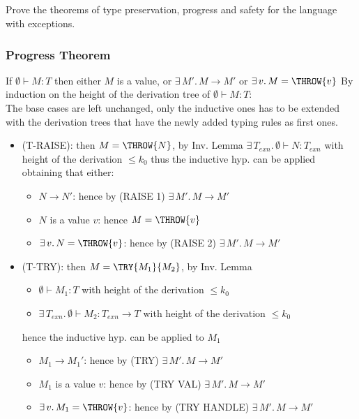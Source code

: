 \subsection{}

Prove the theorems of type preservation, progress and safety for the language with exceptions.

\subsubsection*{Progress Theorem}

If $\emptyset \vdash M: T$ then either $M$ is a value, or $\exists\, M'.\, M \to M'$ or
$\exists\, v.\, M = \THROW{v}$
By induction on the height of the derivation tree of $\emptyset \vdash M: T$:\\
The base cases are left unchanged, only the inductive ones has to be extended with the derivation
trees that have the newly added typing rules as first ones.
\begin{itemize}
	\item (T-RAISE): then $M = \THROW{N}$, by Inv. Lemma $\exists\, T_{exn}.\, \emptyset \vdash N: T_{exn}$ with
	      height of the derivation $\le k_0$ thus the inductive hyp. can be applied obtaining that
	      either:
	      \begin{itemize}
		      \item $N \to N'$: hence by (RAISE 1) $\exists\, M'.\, M \to M'$
		      \item $N$ is a value $v$: hence $M = \THROW{v}$
		      \item $\exists\, v.\, N = \THROW{v}$: hence by (RAISE 2) $\exists\, M'.\, M \to M'$
	      \end{itemize}
	\item (T-TRY): then $M = \TRY{M_1}{M_2}$, by Inv. Lemma
	      \begin{itemize}
		      \item $\emptyset \vdash M_1: T$ with height of the derivation $\le k_0$
		      \item $\exists\, T_{exn}.\, \emptyset \vdash M_2: T_{exn} \to T$ with height of the derivation $\le k_0$
	      \end{itemize}
	      hence the inductive hyp. can be applied to $M_1$
	      \begin{itemize}
		      \item $M_1 \to M_1'$: hence by (TRY) $\exists\, M'.\, M \to M'$
		      \item $M_1$ is a value $v$: hence by (TRY VAL) $\exists\, M'.\, M \to M'$
		      \item $\exists\, v.\, M_1 = \THROW{v}$: hence by (TRY HANDLE) $\exists\, M'.\, M \to M'$
	      \end{itemize}
\end{itemize}

